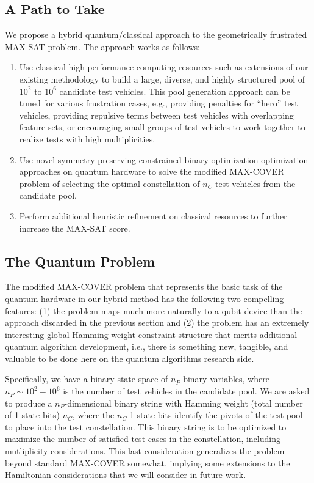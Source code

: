 \documentclass[aps,pra,twocolumn,superscriptaddress,groupedaddress]{revtex4}  %
\begin{document}
\subsection{A Path to Take}

We propose a hybrid quantum/classical approach to the geometrically frustrated MAX-SAT
problem. The approach works as follows:
\begin{enumerate}
\item Use classical high performance computing resources such as extensions of
our existing methodology to build a large, diverse, and highly structured pool
of $10^{2}$ to $10^{6}$ candidate test vehicles. This pool generation approach
can be tuned for various frustration cases, e.g., providing penalties for
``hero'' test vehicles, providing repulsive terms between test vehicles with overlapping
feature sets, or encouraging small groups of test vehicles to work together to
realize tests with high multiplicities.
\item Use novel symmetry-preserving constrained binary optimization optimization
approaches on quantum hardware to solve the modified MAX-COVER problem of
selecting the optimal constellation of $n_{C}$ test vehicles from the candidate
pool. 
\item Perform additional heuristic refinement on classical resources to further
increase the MAX-SAT score.
\end{enumerate}

\subsection{The Quantum Problem}

The modified MAX-COVER problem that represents the basic task of the quantum
hardware in our hybrid method has the following two compelling features: (1) the
problem maps much more naturally to a qubit device than the approach discarded
in the previous section and (2) the problem has an extremely interesting global
Hamming weight constraint structure that merits additional quantum algorithm
development, i.e., there is something new, tangible, and valuable to be done
here on the quantum algorithms research side. 

Specifically, we have a binary state space of $n_{P}$ binary variables, where
$n_{P} \sim 10^{2} - 10^{6}$ is the number of test vehicles in the candidate
pool. We are asked to produce a $n_{P}$-dimensional binary string with Hamming
weight (total number of 1-state bits) $n_{C}$, where the $n_{C}$ 1-state bits
identify the pivots of the test pool to place into the test constellation. This
binary string is to be optimized to maximize the number of satisfied test cases
in the constellation, including mutliplicity considerations. This last
consideration generalizes the problem beyond standard MAX-COVER somewhat,
implying some extensions to the Hamiltonian considerations that we will consider
in future work. 
\end{document}
